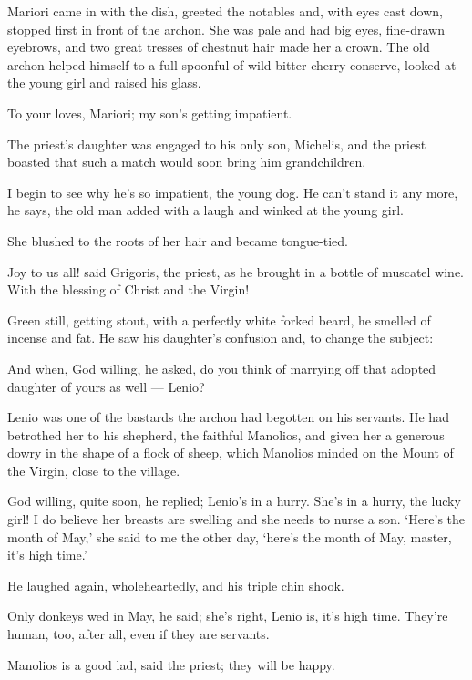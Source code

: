 \documentclass[diploma]{softlab-thesis}
\begin{document}
Mariori came in with the dish, greeted the notables and, with eyes cast
down, stopped first in front of the archon. She was pale and had big eyes,
fine-drawn eyebrows, and two great tresses of chestnut hair made her a
crown. The old archon helped himself to a full spoonful of wild bitter
cherry conserve, looked at the young girl and raised his glass.

To your loves, Mariori; my son’s getting impatient.

The priest’s daughter was engaged to his only son, Michelis, and the priest
boasted that such a match would soon bring him grandchildren.

I begin to see why he’s so impatient, the young dog. He can’t stand it any
more, he says, the old man added with a laugh and winked at the young girl.

She blushed to the roots of her hair and became tongue-tied.

Joy to us all! said Grigoris, the priest, as he brought in a bottle of
muscatel wine. With the blessing of Christ and the Virgin!

Green still, getting stout, with a perfectly white forked beard, he smelled
of incense and fat. He saw his daughter’s confusion and, to change the
subject:

And when, God willing, he asked, do you think of marrying off that adopted
daughter of yours as well --- Lenio?

Lenio was one of the bastards the archon had begotten on his servants. He
had betrothed her to his shepherd, the faithful Manolios, and given her a
generous dowry in the shape of a flock of sheep, which Manolios minded on
the Mount of the Virgin, close to the village.

God willing, quite soon, he replied; Lenio’s in a hurry. She’s in a hurry,
the lucky girl! I do believe her breasts are swelling and she needs to nurse
a son. `Here’s the month of May,' she said to me the other day, `here’s the
month of May, master, it’s high time.'

He laughed again, wholeheartedly, and his triple chin shook.

Only donkeys wed in May, he said; she’s right, Lenio is, it’s high
time. They’re human, too, after all, even if they are servants.

Manolios is a good lad, said the priest; they will be happy.




\nocite{*}
\end{document}
